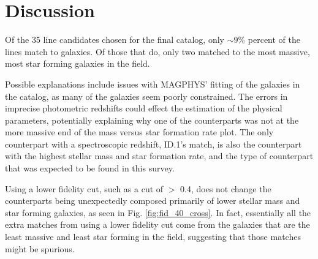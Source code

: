 
\section{Discussion}

Of the 35 line candidates chosen for the final catalog, only $\sim$9\% percent of the lines match to galaxies. Of those that do, only two matched to the most massive, most star forming galaxies in the field. %


Possible explanations include issues with MAGPHYS' fitting of the galaxies in the catalog, as many of the galaxies seem poorly constrained. The errors in imprecise photometric redshifts could effect the estimation of the physical parameters, potentially explaining why one of the counterparts was not at the more massive end of the mass versus star formation rate plot. The only counterpart with a spectroscopic redshift, ID.1's match, is also the counterpart with the highest stellar mass and star formation rate, and the type of counterpart that was expected to be found in this survey.

Using a lower fidelity cut, such as a cut of $>$ 0.4, does not change the counterparts being unexpectedly composed primarily of lower stellar mass and star forming galaxies, as seen in Fig. \ref{fig:fid_40_cross}. In fact, essentially all the extra matches from using a lower fidelity cut come from the galaxies that are the least massive and least star forming in the field, suggesting that those matches might be spurious.

